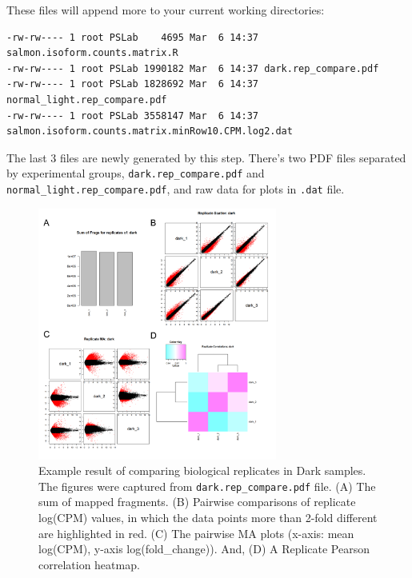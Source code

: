 \documentclass[
  letterpaper,
  DIV=11,
  numbers=noendperiod]{scrreprt}
\begin{document}
These files will append more to your current working directories:

\begin{verbatim}
-rw-rw---- 1 root PSLab    4695 Mar  6 14:37 salmon.isoform.counts.matrix.R
-rw-rw---- 1 root PSLab 1990182 Mar  6 14:37 dark.rep_compare.pdf
-rw-rw---- 1 root PSLab 1828692 Mar  6 14:37 normal_light.rep_compare.pdf
-rw-rw---- 1 root PSLab 3558147 Mar  6 14:37 salmon.isoform.counts.matrix.minRow10.CPM.log2.dat
\end{verbatim}

The last 3 files are newly generated by this step. There's two PDF files
separated by experimental groups, \texttt{dark.rep\_compare.pdf} and
\texttt{normal\_light.rep\_compare.pdf}, and raw data for plots in
\texttt{.dat} file.

\begin{figure}

{\centering \includegraphics[width=0.7\textwidth,height=\textheight]{assets/32_trinity_compare_reps.png}

}

\caption{Example result of comparing biological replicates in Dark
samples. The figures were captured from \texttt{dark.rep\_compare.pdf}
file. (A) The sum of mapped fragments. (B) Pairwise comparisons of
replicate log(CPM) values, in which the data points more than 2-fold
different are highlighted in red. (C) The pairwise MA plots (x-axis:
mean log(CPM), y-axis log(fold\_change)). And, (D) A Replicate Pearson
correlation heatmap.}

\end{figure}
\end{document}
